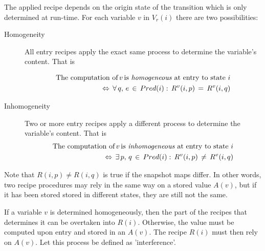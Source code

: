 \documentclass[12pt,a4paper]{scrartcl}
\begin{document}
The applied recipe depends on the origin state of the transition which is only
determined at run-time.  For each variable $v$ in $V_r(i)$ there are two
possibilities:

\begin{description}
    \item[Homogeneity] All entry recipes apply the exact same process to
                       determine the variable's content. That is

    \begin{equation}
        \begin{aligned}
        \mbox{The computation of}\,v\,\mbox{is \textit{homogeneous} at entry to state $i$}\\
        \Leftrightarrow\,\forall\,q,\,e\,\in\,Pred(i):\,R^v(i,p)\,=\,R^v(i,q) 
        \end{aligned}
    \end{equation}

    \item[Inhomogeneity] Two or more entry recipes apply a different process
                         to determine the variable's content. That is
    \begin{equation}
        \begin{aligned}
        \mbox{The computation of}\,v\,\mbox{is \textit{inhomogeneous} at entry to state $i$}\\
        \Leftrightarrow\,\exists\,p,\,q\,\in\,Pred(i):\,R^v(i,p)\,\neq\,R^v(i,q)
        \end{aligned}
    \end{equation}
\end{description}

Note that $R(i,p) \neq R(i,q)$ is true if the snapshot maps differ. In other
words, two recipe procedures may rely in the same way on a stored value $A(v)$,
but if it has been stored stored in different states, they are still not
the same.

If a variable $v$ is determined homogeneously, then the part of the recipes
that determines it can be overtaken into $R(i)$. Otherwise, the value must be
computed upon entry and stored in an $A(v)$. The recipe $R(i)$ must then rely
on $A(v)$. Let this process be defined as 'interference'.
\end{document}
